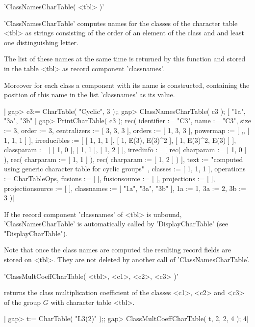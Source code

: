 %

'ClassNamesCharTable( <tbl> )'

'ClassNamesCharTable'  computes  names  for the classes of  the character
table <tbl> as strings consisting of the order of an element of the class
and and least one distinguishing letter.

The list of these names at the same time is returned by this
function and stored in the table <tbl> as record component 'classnames'.

Moreover for each class a component with its name is constructed,
containing the position of this name in the list 'classnames' as its
value.

|    gap> c3:= CharTable( "Cyclic", 3 );;
    gap> ClassNamesCharTable( c3 );
    [ "1a", "3a", "3b" ]
    gap> PrintCharTable( c3 );
    rec( identifier := "C3", name := "C3", size := 3, order :=
    3, centralizers := [ 3, 3, 3 ], orders := [ 1, 3, 3 ], powermap :=
    [ ,, [ 1, 1, 1 ] ], irreducibles :=
    [ [ 1, 1, 1 ], [ 1, E(3), E(3)^2 ], [ 1, E(3)^2, E(3) ]
     ], classparam := [ [ 1, 0 ], [ 1, 1 ], [ 1, 2 ] ], irredinfo :=
    [ rec(
          charparam := [ 1, 0 ] ), rec(
          charparam := [ 1, 1 ] ), rec(
          charparam := [ 1, 2 ] )
     ], text := "computed using generic character table for cyclic groups"\
    , classes := [ 1, 1, 1 ], operations := CharTableOps, fusions :=
    [  ], fusionsource := [  ], projections := [  ], projectionsource :=
    [  ], classnames := [ "1a", "3a", "3b" ], 1a := 1, 3a := 2, 3b := 3 )|

If the record component 'classnames' of <tbl> is unbound,
'ClassNamesCharTable' is automatically called by  'DisplayCharTable' (see
"DisplayCharTable").

Note that once the class names are computed the resulting record fields
are stored on <tbl>. They are not deleted by another call of
'ClassNamesCharTable'.

\Section{ClassMultCoeffCharTable}%
%

'ClassMultCoeffCharTable( <tbl>, <c1>, <c2>, <c3> )'

returns the class  multiplication coefficient of the  classes  <c1>, <c2>
and <c3> of the group $G$ with character table <tbl>.

|    gap> t:= CharTable( "L3(2)" );;
    gap> ClassMultCoeffCharTable( t, 2, 2, 4 );
    4|

